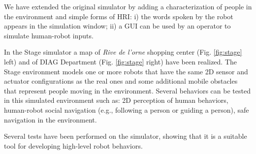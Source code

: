 We have extended the original simulator by adding a characterization of people in the environment and simple forms of HRI: i) the words spoken by the robot appears in the simulation window; ii) a GUI can be used by an operator to simulate human-robot inputs.


In the Stage simulator a map of \emph{Rive de l'orne} shopping center (Fig. \ref{fig:stage} left) and of  DIAG Department (Fig. \ref{fig:stage} right) have been realized.
The Stage environment models one or more robots that have the same 2D sensor and actuator configurations as the real ones and some additional mobile obstacles that represent people moving in the environment. Several behaviors can be tested in this simulated environment such as: 2D perception of human behaviors, human-robot social navigation (e.g., following a person or guiding a person), safe navigation in the environment.

Several tests have been performed on the simulator, showing that it is a suitable tool for developing high-level robot behaviors. 


